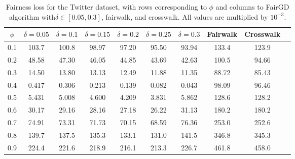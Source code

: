 {\begin{table}[h!]
    \centering
    \begin{tabular}{c|ccccccccc}
        \hline
        $\phi$ & $\delta = 0.05$ & $\delta = 0.1$ & $\delta = 0.15$ & $\delta = 0.2$ & $\delta = 0.25$ & $\delta = 0.3$ & Fairwalk & Crosswalk \\
        \hline
        0.1 & 103.7 & 100.8 & 98.97 & 97.20 & 95.50 & 93.94 & 133.4 & 123.9 \\
        0.2 & 48.58 & 47.30 & 46.05 & 44.85 & 43.69 & 42.63 & 100.5 & 94.66 \\
        0.3 & 14.50 & 13.80 & 13.13 & 12.49 & 11.88 & 11.35 & 88.72 & 85.43 \\
        0.4 & 0.417 & 0.306 & 0.213 & 0.139 & 0.082 & 0.043 & 98.09 & 96.46 \\
        0.5 & 5.431 & 5.008 & 4.600 & 4.209 & 3.831 & 5.862 & 128.6 & 128.2 \\
        0.6 & 30.17 & 29.16 & 28.16 & 27.18 & 26.22 & 31.13 & 180.2 & 180.2 \\
        0.7 & 74.91 & 73.31 & 71.73 & 70.15 & 68.59 & 76.36 & 253.0 & 252.6 \\
        0.8 & 139.7 & 137.5 & 135.3 & 133.1 & 131.0 & 141.5 & 346.8 & 345.3 \\
        0.9 & 224.4 & 221.6 & 218.9 & 216.1 & 213.3 & 226.7 & 461.8 & 458.0 \\
        \hline
    \end{tabular}
    \caption{Fairness loss for the Twitter dataset, with rows corresponding to $\phi$ and columns to FairGD algorithm with$\delta \in [0.05, 0.3]$, fairwalk, and crosswalk. All values are multiplied by $10^{-3}$.}
    \label{tab:constraint_twitter_loss}
\end{table}

}
